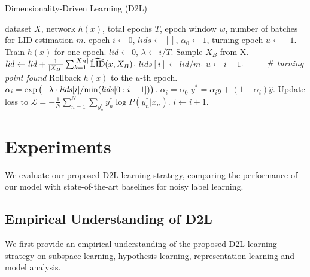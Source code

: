 \documentclass{article}
\begin{document}
\begin{algorithm}[tb]
   \caption{Dimensionality-Driven Learning (D2L)}
   \label{alg:manifold}
\begin{algorithmic}
    dataset $X$, network $h(x)$, total epochs $T$, epoch window $w$, number of batches for LID estimation  $m$.
   epoch $i\leftarrow 0$, $\mathit{lids} \leftarrow []$, $\alpha_0 \leftarrow 1$, turning epoch $u \leftarrow {-1}$.
  \REPEAT
   \STATE Train $h(x)$ for one epoch.
   \STATE $\mathit{lid} \leftarrow 0$, $\lambda \leftarrow i/T$.
   \STATE Sample $X_B$ from X.
   \STATE $\mathit{lid} \leftarrow \mathit{lid} + \frac{1}{|X_B|}\sum_{k=1}^{|X_B|}\widehat{\textup{LID}}(x, X_B)$.
   \ENDFOR
   \STATE $\mathit{lids[i]} \leftarrow \mathit{lid} / m$.
   \STATE $u \leftarrow i - 1$. ~~~~~\# \textit{turning point found}
   \STATE Rollback $h(x)$ to the $u$-th epoch.
   \ENDIF
   \STATE $\alpha_i = \exp \big({-\lambda}\cdot\mathit{lids}[i] / \textup{min}(\mathit{lids}[0:i-1])\big)$.
   \ELSE
   \STATE $\alpha_i = \alpha_0$
  \ENDIF
   \STATE  $y^{*} = \alpha_i y + (1 - \alpha_i) \widehat y$.
   \STATE Update loss to $\mathcal{L} = - \frac{1}{N}\sum_{n = 1}^{N} \sum_{y_n^*} y_n^*\log P(y_n^*|x_n)$.
   \STATE $i \leftarrow i+1$.
\end{algorithmic}
\end{algorithm}


\section{Experiments}\label{sec:experiments}
We evaluate our proposed D2L learning strategy, comparing the performance of our model with state-of-the-art baselines for noisy label learning.

\subsection{Empirical Understanding of D2L}
\label{sec:understanding}
We first provide an empirical understanding of the proposed D2L learning strategy on subspace learning, hypothesis learning, representation learning and model analysis.
\end{document}
